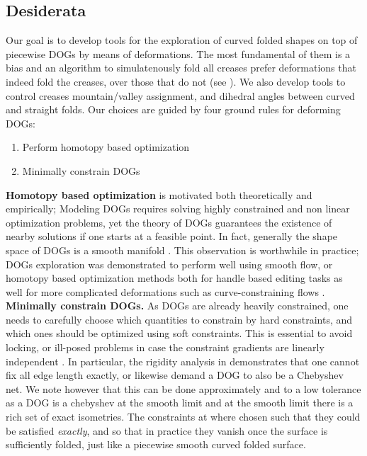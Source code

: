 \subsection{Desiderata}
Our goal is to develop tools for the exploration of curved folded shapes on top of piecewise DOGs by means of deformations. The most fundamental of them is a bias and an algorithm to simulatenously fold all creases prefer deformations that indeed fold the creases, over those that do not (see ). We also develop tools to control creases mountain/valley assignment, and dihedral angles between curved and straight folds. Our choices are guided by four ground rules for deforming DOGs:
\begin{enumerate}
  \item Perform homotopy based optimization \label{homotopy_opt}
  \item Minimally constrain DOGs \label{minimal_const}
\end{enumerate}
\textbf{Homotopy based optimization} is motivated both theoretically and empirically; Modeling DOGs requires solving highly constrained and non linear optimization problems, yet the theory of DOGs guarantees the existence of nearby solutions if one starts at a feasible point. In fact, generally the shape space of DOGs is a smooth manifold \cite{rabi2018shape}. This observation is worthwhile in practice; DOGs exploration was demonstrated to perform well using smooth flow, or homotopy based optimization methods both for handle based editing tasks as well for more complicated deformations such as curve-constraining flows \cite{rabi2018shape}. \\
\textbf{Minimally constrain DOGs.} As DOGs are already heavily constrained, one needs to carefully choose which quantities to constrain by hard constraints, and which ones should be optimized using soft constraints. This is essential to avoid locking, or ill-posed problems in case the constraint gradients are linearly independent \cite{rabi2018shape}. In particular, the rigidity analysis in \cite{rabi18} demonstrates that one cannot fix all edge length exactly, or likewise demand a DOG to also be a Chebyshev net. We note however that this can be done approximately and to a low tolerance as a DOG is a chebyshev at the smooth limit and at the smooth limit there is a rich set of exact isometries. The constraints at  where chosen such that they could be satisfied \textit{exactly}, and so that in practice they vanish once the surface is sufficiently folded, just like a piecewise smooth curved folded surface. \\
